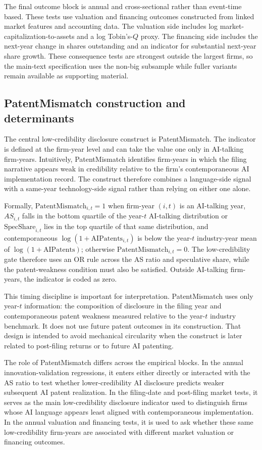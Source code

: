 The final outcome block is annual and cross-sectional rather than event-time based. These tests use valuation and financing outcomes constructed from linked market features and accounting data. The valuation side includes log market-capitalization-to-assets and a log Tobin's-$Q$ proxy. The financing side includes the next-year change in shares outstanding and an indicator for substantial next-year share growth. These consequence tests are strongest outside the largest firms, so the main-text specification uses the non-big subsample while fuller variants remain available as supporting material.

\subsection{PatentMismatch construction and determinants}

The central low-credibility disclosure construct is PatentMismatch. The indicator is defined at the firm-year level and can take the value one only in AI-talking firm-years. Intuitively, PatentMismatch identifies firm-years in which the filing narrative appears weak in credibility relative to the firm's contemporaneous AI implementation record. The construct therefore combines a language-side signal with a same-year technology-side signal rather than relying on either one alone.

Formally, $\mathrm{PatentMismatch}_{i,t}=1$ when firm-year $(i,t)$ is an AI-talking year, $AS_{i,t}$ falls in the bottom quartile of the year-$t$ AI-talking distribution or $\mathrm{SpecShare}_{i,t}$ lies in the top quartile of that same distribution, and contemporaneous $\log(1+\mathrm{AIPatents}_{i,t})$ is below the year-$t$ industry-year mean of $\log(1+\mathrm{AIPatents})$; otherwise $\mathrm{PatentMismatch}_{i,t}=0$. The low-credibility gate therefore uses an OR rule across the AS ratio and speculative share, while the patent-weakness condition must also be satisfied. Outside AI-talking firm-years, the indicator is coded as zero.

This timing discipline is important for interpretation. PatentMismatch uses only year-$t$ information: the composition of disclosure in the filing year and contemporaneous patent weakness measured relative to the year-$t$ industry benchmark. It does not use future patent outcomes in its construction. That design is intended to avoid mechanical circularity when the construct is later related to post-filing returns or to future AI patenting.

The role of PatentMismatch differs across the empirical blocks. In the annual innovation-validation regressions, it enters either directly or interacted with the AS ratio to test whether lower-credibility AI disclosure predicts weaker subsequent AI patent realization. In the filing-date and post-filing market tests, it serves as the main low-credibility disclosure indicator used to distinguish firms whose AI language appears least aligned with contemporaneous implementation. In the annual valuation and financing tests, it is used to ask whether these same low-credibility firm-years are associated with different market valuation or financing outcomes.

